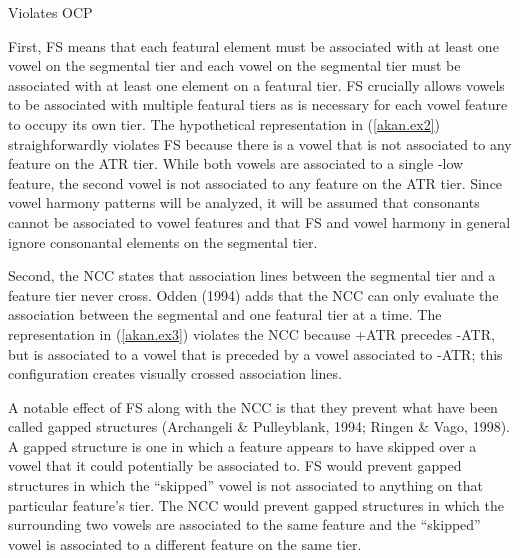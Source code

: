 \documentclass[,doc,floatsintext]{apa6}
\theoremstyle{definition}
\theoremstyle{definition}
\theoremstyle{definition}
\theoremstyle{remark}
\begin{document}
\begin{exe}
\ex \label{akan.ex4} Violates OCP
\end{exe}

First, FS means that each featural element must be associated with at
least one vowel on the segmental tier and each vowel on the segmental
tier must be associated with at least one element on a featural tier. FS
crucially allows vowels to be associated with multiple featural tiers as
is necessary for each vowel feature to occupy its own tier. The
hypothetical representation in (\ref{akan.ex2}) straighforwardly
violates FS because there is a vowel that is not associated to any
feature on the ATR tier. While both vowels are associated to a single
-low feature, the second vowel is not associated to any feature on the
ATR tier. Since vowel harmony patterns will be analyzed, it will be
assumed that consonants cannot be associated to vowel features and that
FS and vowel harmony in general ignore consonantal elements on the
segmental tier.

Second, the NCC states that association lines between the segmental tier
and a feature tier never cross. Odden (1994) adds that the NCC can only
evaluate the association between the segmental and one featural tier at
a time. The representation in (\ref{akan.ex3}) violates the NCC because
+ATR precedes -ATR, but is associated to a vowel that is preceded by a
vowel associated to -ATR; this configuration creates visually crossed
association lines.

A notable effect of FS along with the NCC is that they prevent what have
been called gapped structures (Archangeli \& Pulleyblank, 1994; Ringen
\& Vago, 1998). A gapped structure is one in which a feature appears to
have skipped over a vowel that it could potentially be associated to. FS
would prevent gapped structures in which the \enquote{skipped} vowel is
not associated to anything on that particular feature's tier. The NCC
would prevent gapped structures in which the surrounding two vowels are
associated to the same feature and the \enquote{skipped} vowel is
associated to a different feature on the same tier.
\end{document}
